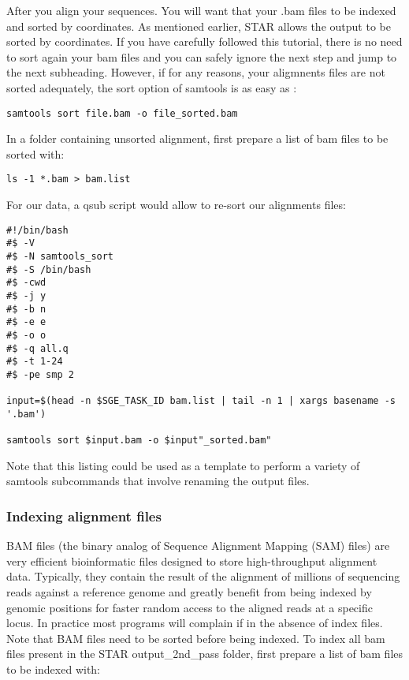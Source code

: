 After you align your sequences. You will want that your .bam files to be indexed and sorted by coordinates. As mentioned earlier, STAR allows the output to be sorted by coordinates. If you have carefully followed this tutorial, there is no need to sort again your bam files and you can safely ignore the next step and jump to the next subheading. However, if for any reasons, your aligmnents files are not sorted adequately, the sort option of samtools is as easy as :

\begin{verbatim}
samtools sort file.bam -o file_sorted.bam
\end{verbatim}

In a folder containing unsorted alignment, first prepare a list of bam files to be sorted with:

\begin{verbatim}
ls -1 *.bam > bam.list
\end{verbatim}

For our data, a qsub script would allow to re-sort our alignments files:


\begin{verbatim}
#!/bin/bash
#$ -V
#$ -N samtools_sort
#$ -S /bin/bash
#$ -cwd
#$ -j y
#$ -b n
#$ -e e
#$ -o o
#$ -q all.q
#$ -t 1-24
#$ -pe smp 2

input=$(head -n $SGE_TASK_ID bam.list | tail -n 1 | xargs basename -s '.bam')

samtools sort $input.bam -o $input"_sorted.bam"

\end{verbatim}

Note that this listing could be used as a template to perform a variety of samtools subcommands that involve renaming the output files.


\subsubsection{Indexing alignment files}

BAM files (the binary analog of Sequence Alignment Mapping (SAM) files) are very efficient bioinformatic files designed to store high-throughput alignment data. Typically, they contain the result of the alignment of millions of sequencing reads against a reference genome and greatly benefit from being  indexed by genomic positions for faster random access to the aligned reads at a specific locus. In practice most programs will complain if in the absence of index files. Note that BAM files need to be sorted before being indexed. To index all bam files present in the STAR output\_2nd\_pass folder, first prepare a list of bam files to be indexed with:


